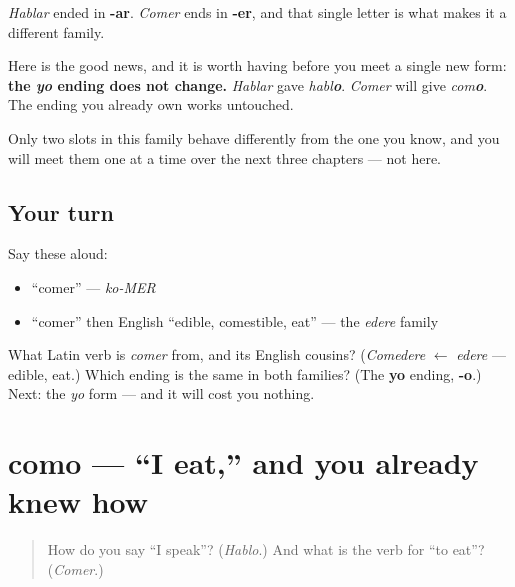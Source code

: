\begin{grammarlens}[title={Grammar Lens: one family over, and one ending already yours}]
\emph{Hablar} ended in \textbf{-ar}. \emph{Comer} ends in \textbf{-er}, and that single letter is what makes it a different family.

Here is the good news, and it is worth having before you meet a single new form: \textbf{the \emph{yo} ending does not change.} \emph{Hablar} gave \emph{habl\textbf{o}}. \emph{Comer} will give \emph{com\textbf{o}}. The ending you already own works untouched.

Only two slots in this family behave differently from the one you know, and you will meet them one at a time over the next three chapters — not here.
\end{grammarlens}

\subsection*{Your turn}
Say these aloud:

\begin{itemize}
\raggedright
  \item \textquotedblleft{}comer\textquotedblright{} — \emph{ko-MER}
  \item \textquotedblleft{}comer\textquotedblright{} then English \textquotedblleft{}edible, comestible, eat\textquotedblright{} — the \emph{edere} family
\end{itemize}

\begin{tcolorbox}[breakable,colback=teal!4,colframe=teal!35!black,title={Before you move on}]
What Latin verb is \emph{comer} from, and its English cousins? (\emph{Comedere} $\leftarrow$ \emph{edere} — edible, eat.) Which ending is the same in both families? (The \textbf{yo} ending, \textbf{-o}.) Next: the \emph{yo} form — and it will cost you nothing.
\end{tcolorbox}
\section[como]{como — \textquotedblleft{}I eat,\textquotedblright{} and you already knew how}

\label{lesson:ES-C07-como}



\begin{quote}
How do you say \textquotedblleft{}I speak\textquotedblright{}? (\emph{Hablo}.) And what is the verb for \textquotedblleft{}to eat\textquotedblright{}? (\emph{Comer}.)
\end{quote}

